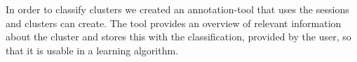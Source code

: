 In order to classify clusters we created an annotation-tool that uses the sessions and clusters can create. The tool provides an overview of relevant information about the cluster and stores this with the classification, provided by the user, so that it is usable in a learning algorithm.
